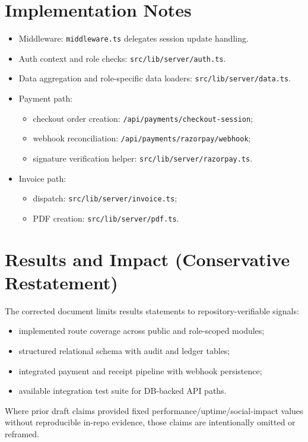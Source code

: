 \documentclass[12pt,a4paper]{article}
\begin{document}
\section{Implementation Notes}
\begin{itemize}
  \item Middleware: \texttt{middleware.ts} delegates session update handling.
  \item Auth context and role checks: \texttt{src/lib/server/auth.ts}.
  \item Data aggregation and role-specific data loaders: \texttt{src/lib/server/data.ts}.
  \item Payment path:
  \begin{itemize}
    \item checkout order creation: \texttt{/api/payments/checkout-session};
    \item webhook reconciliation: \texttt{/api/payments/razorpay/webhook};
    \item signature verification helper: \texttt{src/lib/server/razorpay.ts}.
  \end{itemize}
  \item Invoice path:
  \begin{itemize}
    \item dispatch: \texttt{src/lib/server/invoice.ts};
    \item PDF creation: \texttt{src/lib/server/pdf.ts}.
  \end{itemize}
\end{itemize}

\section{Results and Impact (Conservative Restatement)}
The corrected document limits results statements to repository-verifiable signals:
\begin{itemize}
  \item implemented route coverage across public and role-scoped modules;
  \item structured relational schema with audit and ledger tables;
  \item integrated payment and receipt pipeline with webhook persistence;
  \item available integration test suite for DB-backed API paths.
\end{itemize}

Where prior draft claims provided fixed performance/uptime/social-impact values without reproducible in-repo evidence, those claims are intentionally omitted or reframed.
\end{document}
